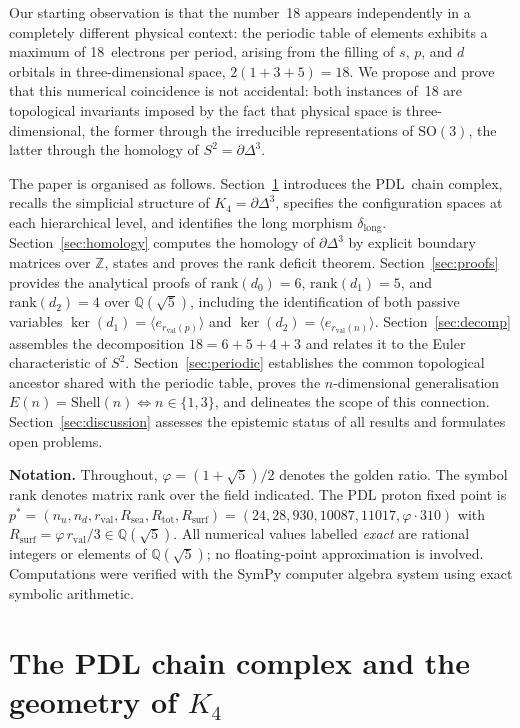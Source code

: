\documentclass[11pt,a4paper]{article}
\theoremstyle{definition}
\newcommand{\PDL}{\textnormal{PDL}}
\newcommand{\Rsurf}{R_{\mathrm{surf}}}
\newcommand{\Rsea}{R_{\mathrm{sea}}}
\newcommand{\Rtot}{R_{\mathrm{tot}}}
\newcommand{\rval}{r_{\mathrm{val}}}
\newcommand{\Kfour}{K_4}
\newcommand{\Sfour}{\partial\Delta^3}
\newcommand{\rank}{\mathrm{rank}}
\newcommand{\dmap}[1]{d_{#1}}
\newcommand{\dlong}{\delta_{\mathrm{long}}}
\newcommand{\vp}{\varphi}
\newcommand{\Efun}{E}
\newcommand{\Shell}{\mathrm{Shell}}
\begin{document}
Our starting observation is that the number~18 appears independently in a completely different physical context: the periodic table of elements exhibits a maximum of 18~electrons per period, arising from the filling of $s$, $p$, and $d$ orbitals in three-dimensional space, $2(1+3+5) = 18$. We propose and prove that this numerical coincidence is not accidental: both instances of~18 are topological invariants imposed by the fact that physical space is three-dimensional, the former through the irreducible representations of $\mathrm{SO}(3)$, the latter through the homology of $S^2 = \Sfour$.

The paper is organised as follows. Section~\ref{sec:complex} introduces the \PDL\ chain complex, recalls the simplicial structure of $\Kfour = \Sfour$, specifies the configuration spaces at each hierarchical level, and identifies the long morphism $\dlong$. Section~\ref{sec:homology} computes the homology of $\Sfour$ by explicit boundary matrices over $\mathbb{Z}$, states and proves the rank deficit theorem. Section~\ref{sec:proofs} provides the analytical proofs of $\rank(\dmap{0}) = 6$, $\rank(\dmap{1}) = 5$, and $\rank(\dmap{2}) = 4$ over $\mathbb{Q}(\sqrt{5})$, including the identification of both passive variables $\ker(\dmap{1}) = \langle e_{\rval(p)}\rangle$ and $\ker(\dmap{2}) = \langle e_{\rval(n)}\rangle$. Section~\ref{sec:decomp} assembles the decomposition $18 = 6+5+4+3$ and relates it to the Euler characteristic of $S^2$. Section~\ref{sec:periodic} establishes the common topological ancestor shared with the periodic table, proves the $n$-dimensional generalisation $\Efun(n) = \Shell(n) \iff n \in \{1,3\}$, and delineates the scope of this connection. Section~\ref{sec:discussion} assesses the epistemic status of all results and formulates open problems.

\medskip\noindent\textbf{Notation.} Throughout, $\vp = (1+\sqrt{5})/2$ denotes the golden ratio. The symbol $\rank$ denotes matrix rank over the field indicated. The PDL proton fixed point is $p^* = (n_u, n_d, \rval, \Rsea, \Rtot, \Rsurf) = (24, 28, 930, 10087, 11017, \vp \cdot 310)$ with $\Rsurf = \vp\,\rval/3 \in \mathbb{Q}(\sqrt{5})$. All numerical values labelled \emph{exact} are rational integers or elements of $\mathbb{Q}(\sqrt{5})$; no floating-point approximation is involved. Computations were verified with the SymPy computer algebra system using exact symbolic arithmetic.

\section{The PDL chain complex and the geometry of \texorpdfstring{$K_4$}{K4}}
\label{sec:complex}
\end{document}
